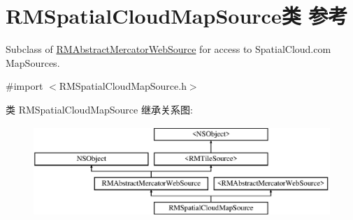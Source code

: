 \hypertarget{interface_r_m_spatial_cloud_map_source}{\section{R\-M\-Spatial\-Cloud\-Map\-Source类 参考}
\label{interface_r_m_spatial_cloud_map_source}
}


Subclass of \hyperlink{interface_r_m_abstract_mercator_web_source}{R\-M\-Abstract\-Mercator\-Web\-Source} for access to Spatial\-Cloud.\-com Map\-Sources.  




{\ttfamily \#import $<$R\-M\-Spatial\-Cloud\-Map\-Source.\-h$>$}

类 R\-M\-Spatial\-Cloud\-Map\-Source 继承关系图\-:\begin{figure}[H]
\begin{center}
\leavevmode
\includegraphics[height=3.425076cm]{interface_r_m_spatial_cloud_map_source}
\end{center}
\end{figure}
